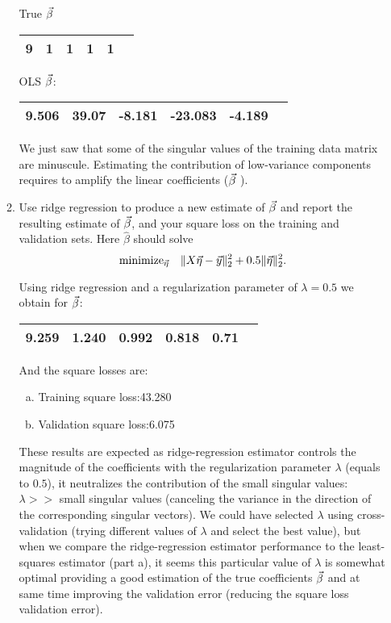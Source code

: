 \documentclass[12pt,twoside]{article}
\begin{document}
\begin{enumerate}
\begin{enumerate}
   True $\vec{\beta}$
   \begin{center}
    		\begin{tabular}{ | c | c | c | c | c | c | }
		\hline
			9 & 1 & 1 & 1 &  1\\ 
		\hline
    	\end{tabular}
    \end{center}

  OLS $\vec{\beta}$:
   \begin{center}
    		\begin{tabular}{ | c | c | c | c | c | c | }
		\hline
			9.506 & 39.07 & -8.181 & -23.083 &  -4.189\\ 
		\hline
    	\end{tabular}
    \end{center}

We just saw that some of the singular values of the training data matrix are minuscule. 
Estimating the contribution of low-variance components requires to amplify the linear coefficients ($\vec{\beta}$ ).
    
  \item Use ridge regression to produce a new estimate of $\vec{\beta}$
    and report the resulting estimate of $\vec{\beta}$, and
    your square loss on the training and validation sets.  Here
    $\hat{\beta}$ should solve
    $$\text{minimize}_{\vec{\eta}}\quad \|X\vec{\eta}-\vec{y}\|_2^2 + 0.5\|\vec{\eta}\|_2^2.$$
    
    Using ridge regression and a regularization parameter of $\lambda=0.5$ we obtain for $\vec{\beta}$:
     \begin{center}
    		\begin{tabular}{ | c | c | c | c | c | c | }
		\hline
			9.259 & 1.240 & 0.992 & 0.818 &  0.71 \\ 
		\hline
    	\end{tabular}
    \end{center}
    And the square losses are:
    \begin{enumerate}[(a)]
	\item Training square loss:43.280
	\item Validation square loss:6.075
    \end{enumerate}
  
  These results are expected as ridge-regression estimator controls the magnitude of the coefficients with the regularization parameter $\lambda$ (equals to $0.5$),
  it neutralizes the contribution of the small singular values: $\lambda >> $ small singular values (canceling the variance in the direction of the corresponding singular vectors).
  We could have selected $\lambda$ using cross-validation (trying different values of $\lambda$ and select the best value), 
  but  when we compare the ridge-regression estimator performance to the least-squares estimator (part a),
  it seems this particular value of $\lambda$ is somewhat optimal providing a good estimation of the true coefficients
   $\vec{\beta}$ and at same time improving the validation error (reducing the square loss validation error).
  


\end{enumerate}
\end{enumerate}
\end{document}
